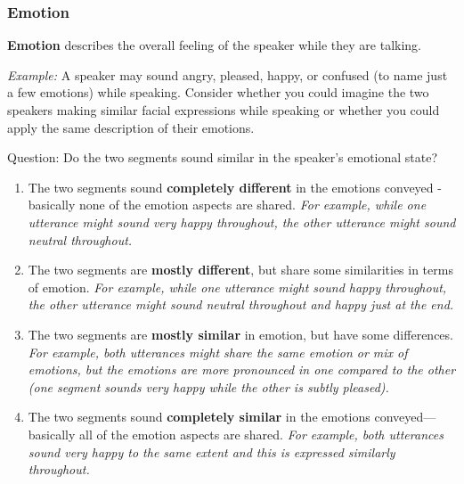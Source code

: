 \subsubsection{Emotion}
\textbf{Emotion} describes the overall feeling of the speaker while they are talking.
\begin{boxA}
\textit{Example:}
A speaker may sound angry, pleased, happy, or confused (to name just a few emotions) while speaking. Consider whether you could imagine the two speakers making similar facial expressions while speaking or whether you could apply the same description of their emotions. 
\end{boxA}
Question: Do the two segments sound similar in the speaker’s emotional state?
\begin{enumerate}
    \item The two segments sound \textbf{completely different} in the emotions conveyed - basically none of the emotion aspects are shared.
    \textit{For example, while one utterance might sound very happy throughout, the other utterance might sound neutral throughout.}
    \item The two segments are \textbf{mostly different}, but share some similarities in terms of emotion.
    \textit{For example, while one utterance might sound happy throughout, the other utterance might sound neutral throughout and happy just at the end.}
    \item The two segments are \textbf{mostly similar} in emotion, but have some differences.
    \textit{For example, both utterances might share the same emotion or mix of emotions, but the emotions are more pronounced in one compared to the other (one segment sounds very happy while the other is subtly pleased).}
    \item The two segments sound \textbf{completely similar} in the emotions conveyed— basically all of the emotion aspects are shared.
    \textit{For example, both utterances sound very happy to the same extent and this is expressed similarly throughout.}
\end{enumerate}

